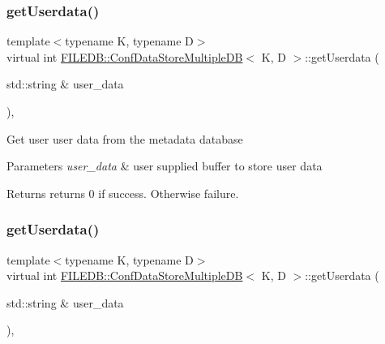 \subsubsection{\texorpdfstring{getUserdata()}{getUserdata()}\hspace{0.1cm}{\footnotesize\ttfamily [1/2]}}
{\footnotesize\ttfamily template$<$typename K, typename D$>$ \\
virtual int \mbox{\hyperlink{classFILEDB_1_1ConfDataStoreMultipleDB}{F\+I\+L\+E\+D\+B\+::\+Conf\+Data\+Store\+Multiple\+DB}}$<$ K, D $>$\+::get\+Userdata (\begin{DoxyParamCaption}\item[{std\+::string \&}]{user\+\_\+data }\end{DoxyParamCaption})\hspace{0.3cm}{\ttfamily [inline]}, {\ttfamily [virtual]}}

Get user user data from the metadata database


\begin{DoxyParams}{Parameters}
{\em user\+\_\+data} & user supplied buffer to store user data \\
\hline
\end{DoxyParams}
\begin{DoxyReturn}{Returns}
returns 0 if success. Otherwise failure. 
\end{DoxyReturn}
\mbox{\label{classFILEDB_1_1ConfDataStoreMultipleDB_aa3f101137804c73d44e2d87538acc014}} 
\subsubsection{\texorpdfstring{getUserdata()}{getUserdata()}\hspace{0.1cm}{\footnotesize\ttfamily [2/2]}}
{\footnotesize\ttfamily template$<$typename K, typename D$>$ \\
virtual int \mbox{\hyperlink{classFILEDB_1_1ConfDataStoreMultipleDB}{F\+I\+L\+E\+D\+B\+::\+Conf\+Data\+Store\+Multiple\+DB}}$<$ K, D $>$\+::get\+Userdata (\begin{DoxyParamCaption}\item[{std\+::string \&}]{user\+\_\+data }\end{DoxyParamCaption})\hspace{0.3cm}{\ttfamily [inline]}, {\ttfamily [virtual]}}

